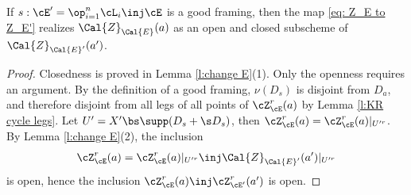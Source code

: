 \begin{cor}
\notready\label{c:ZE open closed} If $s:\cE'=\op_{i=1}^{n}\cL_{i}\inj \cE$ is a good framing, then the map \eqref{eq: Z_E to Z_E'} realizes $\Cal{Z}_{\Cal{E}}(a)$ as an open and closed subscheme of $\Cal{Z}_{\Cal{E}'}(a')$.
\end{cor}
\begin{proof} Closedness is proved in Lemma \ref{l:change E}(1). Only the openness requires an argument.
By the definition of a good framing, $\nu(D_{s})$ is disjoint from $D_{a}$, and therefore disjoint from all legs of all points of $\cZ^{r}_{\cE}(a)$ by Lemma \ref{l:KR cycle legs}. Let $U'=X'\bs \supp(D_{s}+\s D_{s})$, then $\cZ^{r}_{\cE}(a)=\cZ^{r}_{\cE}(a)|_{U'^{r}}$. By Lemma \ref{l:change E}(2), the inclusion
\begin{equation}
\cZ^{r}_{\cE}(a)=\cZ^{r}_{\cE}(a)|_{U'^{r}}\inj \Cal{Z}_{\Cal{E}'}(a')|_{U'^{r}}
\end{equation}
is open, hence the inclusion $\cZ^{r}_{\cE}(a)\inj \cZ^{r}_{\cE'}(a')$ is open.
\end{proof}


